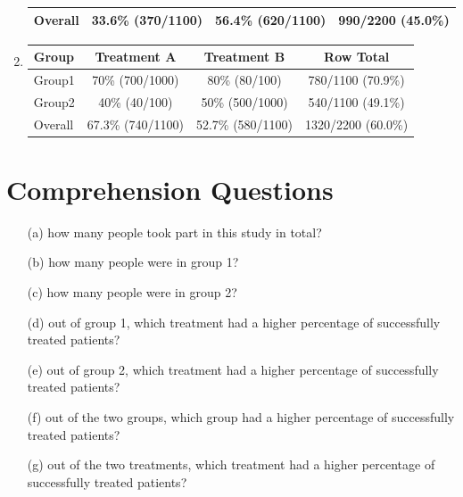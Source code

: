 \documentclass[9pt]{article}
\begin{document}
\begin{enumerate}
{\begin{tabular}{lccc}
\hline
Overall & 33.6\% (370/1100) & 56.4\% (620/1100) & 990/2200 (45.0\%) \\
\hline
\end{tabular}}
\vspace{1cm}
\item
{\renewcommand{\arraystretch}{1.3}
\begin{tabular}{lccc}
\hline
Group & Treatment A & Treatment B & Row Total \\
\hline
Group1 & 70\% (700/1000) & 80\% (80/100) & 780/1100 (70.9\%) \\
Group2 & 40\% (40/100) & 50\% (500/1000) & 540/1100 (49.1\%) \\
\hline
Overall & 67.3\% (740/1100) & 52.7\% (580/1100) & 1320/2200 (60.0\%) \\
\hline
\end{tabular}}
\end{enumerate}
\vspace{1cm}
\section*{Comprehension Questions}

\begin{enumerate}
  \item[(a)] how many people took part in this study in total?  
  \item[(b)] how many people were in group 1?  
  \item[(c)] how many people were in group 2?  
  \item[(d)] out of group 1, which treatment had a higher percentage of successfully treated patients?  
  \item[(e)] out of group 2, which treatment had a higher percentage of successfully treated patients?  
  \item[(f)] out of the two groups, which group had a higher percentage of successfully treated patients?  
  \item[(g)] out of the two treatments, which treatment had a higher percentage of successfully treated patients?
\end{enumerate}
\end{document}
